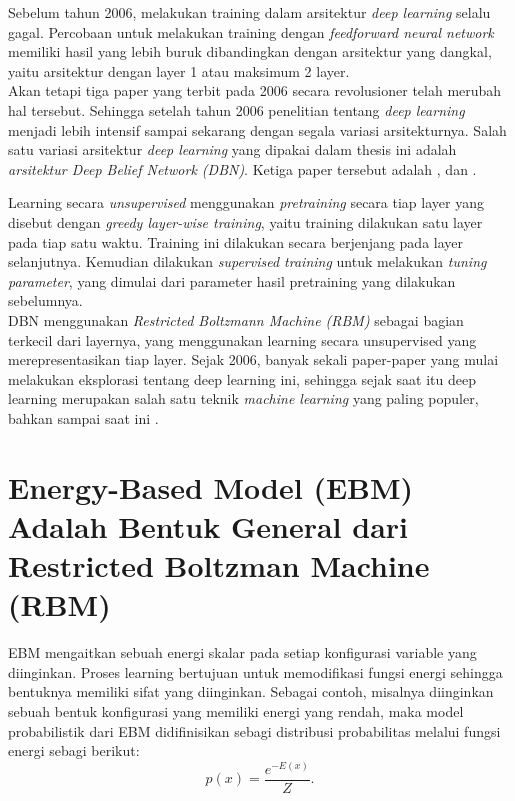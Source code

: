 Sebelum tahun 2006, melakukan training dalam arsitektur \textit{deep learning} selalu gagal. Percobaan untuk melakukan training dengan \textit{feedforward neural network} memiliki hasil yang lebih buruk dibandingkan dengan arsitektur yang dangkal, yaitu arsitektur dengan layer 1 atau maksimum 2 layer.\\
Akan tetapi tiga paper yang terbit pada 2006 secara revolusioner telah merubah hal tersebut. Sehingga setelah tahun 2006 penelitian tentang \textit{deep learning} menjadi lebih intensif sampai sekarang dengan segala variasi arsitekturnya. Salah satu variasi arsitektur \textit{deep learning} yang dipakai dalam thesis ini adalah \textit{arsitektur Deep Belief Network (DBN)}. Ketiga paper tersebut adalah  \cite{hinton2006fast}, \cite{bengio2007greedy} dan \cite{poultney2006efficient}.

Learning secara \textit{unsupervised} menggunakan \textit{pretraining} secara tiap layer yang disebut dengan \textit{greedy layer-wise training}, yaitu training dilakukan  satu layer pada tiap satu waktu. Training ini dilakukan secara berjenjang pada layer selanjutnya. Kemudian dilakukan \textit{supervised training} untuk melakukan \textit{tuning parameter}, yang dimulai dari parameter hasil pretraining yang dilakukan sebelumnya.\\
DBN menggunakan \textit{Restricted Boltzmann Machine (RBM)} sebagai bagian terkecil dari layernya, yang menggunakan learning secara unsupervised yang merepresentasikan tiap layer. Sejak 2006, banyak sekali paper-paper yang mulai melakukan eksplorasi tentang deep learning ini, sehingga sejak saat itu deep learning merupakan salah satu teknik \textit{machine learning} yang paling populer, bahkan sampai saat ini \citep{fakoorusing}.

\section{Energy-Based Model (EBM) Adalah Bentuk General dari Restricted Boltzman Machine (RBM)}

EBM mengaitkan sebuah energi skalar pada setiap konfigurasi variable yang diinginkan. Proses learning bertujuan untuk memodifikasi fungsi energi sehingga bentuknya memiliki  sifat yang diinginkan. Sebagai contoh, misalnya diinginkan sebuah bentuk konfigurasi yang memiliki energi yang rendah, maka model probabilistik dari EBM didifinisikan sebagi distribusi probabilitas melalui fungsi energi sebagi berikut: \citep{poultney2006efficient}
\begin{equation}
p(x) = \frac {e^{-E(x)}} {Z}.
\end{equation}

